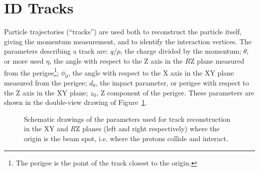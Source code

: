 
\section{ID Tracks}\label{sec:tracks}

Particle trajectories (``tracks'') are used both to reconstruct the particle itself, giving the 
momentum measurement, and to identify the interaction vertices.
The parameters describing a track are: $q/p$, the charge divided by the momentum; $\theta$, or more used $\eta$, the angle
with respect to the Z axis in the $R$Z plane measured from the 
perigee\footnote{The perigee is the point of the track closest to the origin.}; $\phi_0$, the angle 
with respect to the X axis in the XY plane measured from the perigee; $d_0$, the impact parameter, 
or perigee with respect to the Z axis in the XY plane; $z_0$, Z component of the perigee.
These parameters are shown in the double-view drawing of Figure~\ref{fig:trackpar}.

\begin{figure}[tb]\begin{center}
	\caption[bla]{Schematic drawings of the parameters used for track reconstruction in the XY and $R$Z planes (left and right respectively)
          where the origin is the beam spot, i.e. where the protons collide and interact.
\label{fig:trackpar}}
\end{center}\end{figure}

